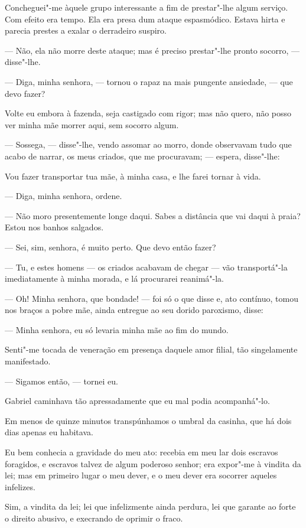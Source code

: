 Concheguei"-me àquele grupo interessante a fim de prestar"-lhe algum
serviço. Com efeito era tempo. Ela era presa dum ataque espasmódico.
Estava hirta e parecia prestes a exalar o derradeiro suspiro.

--- Não, ela não morre deste ataque; mas é preciso prestar"-lhe pronto
socorro, --- disse"-lhe.

--- Diga, minha senhora, --- tornou o rapaz na mais pungente ansiedade,
--- que devo fazer?

Volte eu embora à fazenda, seja castigado com rigor; mas não quero, não
posso ver minha mãe morrer aqui, sem socorro algum.

--- Sossega, --- disse"-lhe, vendo assomar ao morro, donde observavam tudo
que acabo de narrar, os meus criados, que me procuravam; --- espera,
disse"-lhe:

Vou fazer transportar tua mãe, à minha casa, e lhe farei tornar à vida.

--- Diga, minha senhora, ordene.

--- Não moro presentemente longe daqui. Sabes a distância que vai daqui
à praia? Estou nos banhos salgados.

--- Sei, sim, senhora, é muito perto. Que devo então fazer?

--- Tu, e estes homens --- os criados acabavam de chegar --- vão
transportá"-la imediatamente à minha morada, e lá procurarei reanimá"-la.

--- Oh! Minha senhora, que bondade! --- foi só o que disse e, ato
contínuo, tomou nos braços a pobre mãe, ainda entregue ao seu dorido
paroxismo, disse:

--- Minha senhora, eu só levaria minha mãe ao fim do mundo.

Senti"-me tocada de veneração em presença daquele amor filial, tão
singelamente manifestado.

--- Sigamos então, --- tornei eu.

Gabriel caminhava tão apressadamente que eu mal podia acompanhá"-lo.

Em menos de quinze minutos transpúnhamos o umbral da casinha, que há
dois dias apenas eu habitava.

Eu bem conhecia a gravidade do meu ato: recebia em meu lar dois escravos
foragidos, e escravos talvez de algum poderoso senhor; era expor"-me à
vindita da lei; mas em primeiro lugar o meu dever, e o meu dever era
socorrer aqueles infelizes.

Sim, a vindita da lei; lei que infelizmente ainda perdura, lei que
garante ao forte o direito abusivo, e execrando de oprimir o fraco.

